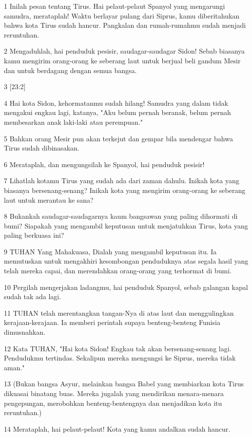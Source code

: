 \par 1 Inilah pesan tentang Tirus. Hai pelaut-pelaut Spanyol yang mengarungi samudra, merataplah! Waktu berlayar pulang dari Siprus, kamu diberitahukan bahwa kota Tirus sudah hancur. Pangkalan dan rumah-rumahmu sudah menjadi reruntuhan.
\par 2 Mengaduhlah, hai penduduk pesisir, saudagar-saudagar Sidon! Sebab biasanya kamu mengirim orang-orang ke seberang laut untuk berjual beli gandum Mesir dan untuk berdagang dengan semua bangsa.
\par 3 [23:2]
\par 4 Hai kota Sidon, kehormatanmu sudah hilang! Samudra yang dalam tidak mengakui engkau lagi, katanya, "Aku belum pernah beranak, belum pernah membesarkan anak laki-laki atau perempuan."
\par 5 Bahkan orang Mesir pun akan terkejut dan gempar bila mendengar bahwa Tirus sudah dibinasakan.
\par 6 Merataplah, dan mengungsilah ke Spanyol, hai penduduk pesisir!
\par 7 Lihatlah kotamu Tirus yang sudah ada dari zaman dahulu. Inikah kota yang biasanya bersenang-senang? Inikah kota yang mengirim orang-orang ke seberang laut untuk merantau ke sana?
\par 8 Bukankah saudagar-saudagarnya kaum bangsawan yang paling dihormati di bumi? Siapakah yang mengambil keputusan untuk menjatuhkan Tirus, kota yang paling berkuasa ini?
\par 9 TUHAN Yang Mahakuasa, Dialah yang mengambil keputusan itu. Ia memutuskan untuk mengakhiri kesombongan penduduknya atas segala hasil yang telah mereka capai, dan merendahkan orang-orang yang terhormat di bumi.
\par 10 Pergilah mengerjakan ladangmu, hai penduduk Spanyol, sebab galangan kapal sudah tak ada lagi.
\par 11 TUHAN telah merentangkan tangan-Nya di atas laut dan menggulingkan kerajaan-kerajaan. Ia memberi perintah supaya benteng-benteng Funisia dimusnahkan.
\par 12 Kata TUHAN, "Hai kota Sidon! Engkau tak akan bersenang-senang lagi. Pendudukmu tertindas. Sekalipun mereka mengungsi ke Siprus, mereka tidak aman."
\par 13 (Bukan bangsa Asyur, melainkan bangsa Babel yang membiarkan kota Tirus dikuasai binatang buas. Mereka jugalah yang mendirikan menara-menara pengepungan, merobohkan benteng-bentengnya dan menjadikan kota itu reruntuhan.)
\par 14 Merataplah, hai pelaut-pelaut! Kota yang kamu andalkan sudah hancur.
